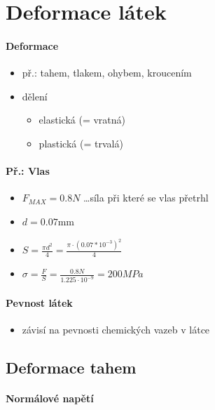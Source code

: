 \section{Deformace látek}
\paragraph{Deformace}
\begin{itemize}
\item př.: tahem, tlakem, ohybem, kroucením
\item dělení
	\begin{itemize}
	\item elastická (= vratná)
	\item plastická (= trvalá)
	\end{itemize}
\end{itemize}


\paragraph{Př.: Vlas}
\begin{itemize}
\item $F_{MAX} = 0.8N$ \ldots síla při které se vlas přetrhl
\item $d = 0.07$mm
\item $S = \frac{\pi d^2}{4} = \frac{\pi \cdot (0.07*10^{-3})^2}{4} $
\item $\sigma = \frac{F}{S} = \frac{0.8N}{1.225 \cdot 10^{-9}} = 200MPa$
\end{itemize}

\paragraph{Pevnost látek}
\begin{itemize}
\item závisí na pevnosti chemických vazeb v látce
\end{itemize}


\subsection{Deformace tahem}
\paragraph{Normálové napětí}

